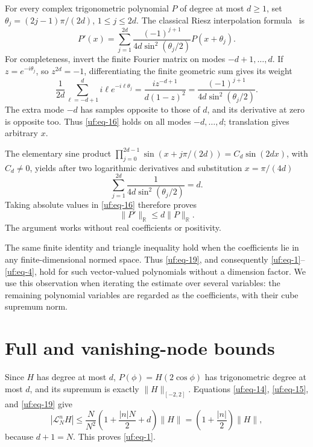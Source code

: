 \documentclass[11pt]{article}
\numberwithin{equation}{section}
\theoremstyle{definition}\newtheorem{definition}[theorem]{Definition}
\theoremstyle{remark}\newtheorem{remark}[theorem]{Remark}
\begin{document}
For every complex trigonometric polynomial \(P\) of degree at most
\(d\ge1\), set \(\theta_j=(2j-1)\pi/(2d)\), \(1\le j\le2d\). The classical Riesz interpolation formula~\cite{Riesz1914}
is \begin{equation}\label{uf:eq-16}
P'(x)=\sum_{j=1}^{2d}
       \frac{(-1)^{j+1}}{4d\sin^2(\theta_j/2)}P(x+\theta_j).
\end{equation} For completeness, invert the finite Fourier matrix on modes
\(-d+1,\ldots,d\). If \(z=e^{-i\theta_j}\), so \(z^{2d}=-1\),
differentiating the finite geometric sum gives its weight \begin{equation}\label{uf:eq-17}
\frac1{2d}\sum_{\ell=-d+1}^{d}i\ell e^{-i\ell\theta_j}
 =\frac{i z^{-d+1}}{d(1-z)^2}
 =\frac{(-1)^{j+1}}{4d\sin^2(\theta_j/2)}.
\end{equation} The extra mode \(-d\) has samples opposite to those of \(d\), and its
derivative at zero is opposite too. Thus \eqref{uf:eq-16} holds on all modes
\(-d,\ldots,d\); translation gives arbitrary \(x\).

The elementary sine product
\(\prod_{j=0}^{2d-1}\sin(x+j\pi/(2d))=C_d\sin(2dx)\), with \(C_d\ne0\),
yields after two logarithmic derivatives and substitution \(x=\pi/(4d)\)
\begin{equation}\label{uf:eq-18}
\sum_{j=1}^{2d}\frac1{4d\sin^2(\theta_j/2)}=d.
\end{equation} Taking absolute values in \eqref{uf:eq-16} therefore proves \begin{equation}\label{uf:eq-19}
\|P'\|_{\mathbb R}\le d\|P\|_{\mathbb R}.
\end{equation} The argument works without real coefficients or positivity.

The same finite identity and triangle inequality hold when the
coefficients lie in any finite-dimensional normed space. Thus
\eqref{uf:eq-19}, and consequently \eqref{uf:eq-1}--\eqref{uf:eq-4},
hold for such vector-valued polynomials without a dimension factor.
We use this observation when iterating the estimate over several
variables: the remaining polynomial variables are regarded as the
coefficients, with their cube supremum norm.

\section{Full and vanishing-node
bounds}\label{uf:sec-full-and-vanishing-node-bounds}

Since \(H\) has degree at most \(d\), \(P(\phi)=H(2\cos\phi)\) has
trigonometric degree at most \(d\), and its supremum is exactly
\(\|H\|_{[-2,2]}\). Equations \eqref{uf:eq-14}, \eqref{uf:eq-15}, and \eqref{uf:eq-19} give \begin{equation}\label{uf:eq-20}
|\mathcal L_N^{n}H|
 \le\frac{N}{N^2}\left(1+\frac{|n|N}{2}+d\right)\|H\|
 =\left(1+\frac{|n|}{2}\right)\|H\|,
\end{equation} because \(d+1=N\). This proves \eqref{uf:eq-1}.
\end{document}
